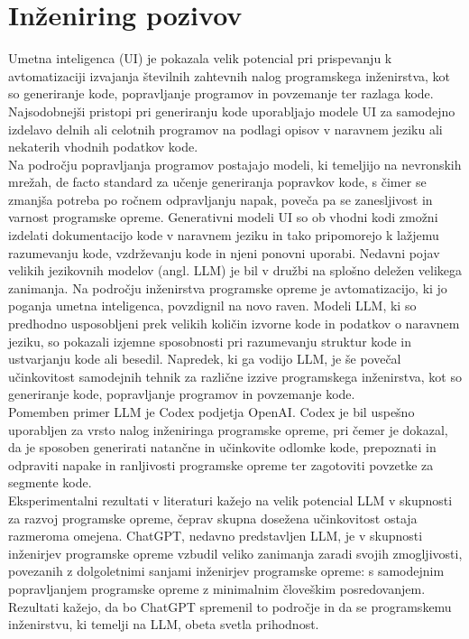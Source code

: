 \documentclass[a4paper,12pt,openright]{book}
\begin{document}
\section{Inženiring pozivov} \label{chap:inz-poz}

Umetna inteligenca (UI) je pokazala velik potencial pri prispevanju k avtomatizaciji izvajanja številnih zahtevnih nalog programskega inženirstva, kot so generiranje kode, popravljanje programov in povzemanje ter razlaga kode. \cite{bavishi2019autopandas} \\
Najsodobnejši pristopi pri generiranju kode uporabljajo modele UI za samodejno izdelavo delnih ali celotnih programov na podlagi opisov v naravnem jeziku ali nekaterih vhodnih podatkov kode. \cite{Chen2021EvaluatingLL}\\
Na področju popravljanja programov postajajo modeli, ki temeljijo na nevronskih mrežah, de facto standard za učenje generiranja popravkov kode, s čimer se zmanjša potreba po ročnem odpravljanju napak, poveča pa se zanesljivost in varnost programske opreme. Generativni modeli UI so ob vhodni kodi zmožni izdelati dokumentacijo kode v naravnem jeziku in tako pripomorejo k lažjemu razumevanju kode, vzdrževanju kode in njeni ponovni uporabi. Nedavni pojav velikih jezikovnih modelov (angl. LLM) je bil v družbi na splošno deležen velikega zanimanja. Na področju inženirstva programske opreme je avtomatizacijo, ki jo poganja umetna inteligenca, povzdignil na novo raven. Modeli LLM, ki so predhodno usposobljeni prek velikih količin izvorne kode in podatkov o naravnem jeziku, so pokazali izjemne sposobnosti pri razumevanju struktur kode in ustvarjanju kode ali besedil. Napredek, ki ga vodijo LLM, je še povečal učinkovitost samodejnih tehnik za različne izzive programskega inženirstva, kot so generiranje kode, popravljanje programov in povzemanje kode. \cite{wan2018improving}\\
Pomemben primer LLM je  Codex podjetja OpenAI. Codex je bil uspešno uporabljen za vrsto nalog inženiringa programske opreme, pri čemer je dokazal, da je sposoben generirati natančne in učinkovite odlomke kode, prepoznati in odpraviti napake in ranljivosti programske opreme ter zagotoviti povzetke za segmente kode. \cite{vaithilingam2022expectation} \\
Eksperimentalni rezultati v literaturi kažejo na velik potencial LLM v skupnosti za razvoj programske opreme, čeprav skupna dosežena učinkovitost ostaja razmeroma omejena. ChatGPT, nedavno predstavljen LLM, je v skupnosti inženirjev programske opreme vzbudil veliko zanimanja zaradi svojih zmogljivosti, povezanih z dolgoletnimi sanjami inženirjev programske opreme: s samodejnim popravljanjem programske opreme z minimalnim človeškim posredovanjem. Rezultati kažejo, da bo ChatGPT spremenil to področje in da se programskemu inženirstvu, ki temelji na LLM, obeta svetla prihodnost. \cite{tian2023chatgptultimateprogrammingassistant} \\
\end{document}

